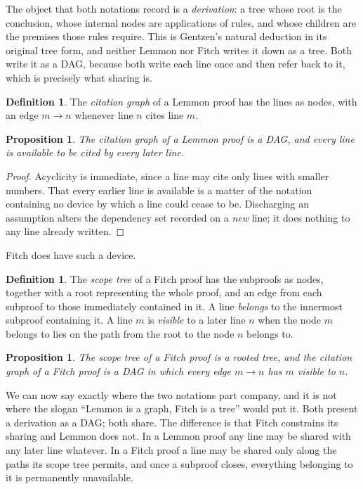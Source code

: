 \documentclass[11pt]{article}
\theoremstyle{plain}
\newtheorem{proposition}[theorem]{Proposition}
\theoremstyle{definition}
\newtheorem{definition}[theorem]{Definition}
\theoremstyle{remark}
\begin{document}
The object that both notations record is a \emph{derivation}: a tree whose
root is the conclusion, whose internal nodes are applications of rules, and
whose children are the premises those rules require. This is Gentzen's
natural deduction in its original tree form, and neither Lemmon nor Fitch
writes it down as a tree. Both write it as a DAG, because both write each line
once and then refer back to it, which is precisely what sharing is.

\begin{definition}
The \emph{citation graph} of a Lemmon proof has the lines as nodes, with an
edge $m \to n$ whenever line $n$ cites line $m$.
\end{definition}

\begin{proposition}\label{prop:lemmondag}
The citation graph of a Lemmon proof is a DAG, and every line is available to
be cited by every later line.
\end{proposition}

\begin{proof}
Acyclicity is immediate, since a line may cite only lines with smaller
numbers. That every earlier line is available is a matter of the notation
containing no device by which a line could cease to be. Discharging an
assumption alters the dependency set recorded on a \emph{new} line; it does
nothing to any line already written.
\end{proof}

Fitch does have such a device.

\begin{definition}
The \emph{scope tree} of a Fitch proof has the subproofs as nodes, together
with a root representing the whole proof, and an edge from each subproof to
those immediately contained in it. A line \emph{belongs} to the innermost
subproof containing it. A line $m$ is \emph{visible} to a later line $n$ when
the node $m$ belongs to lies on the path from the root to the node $n$ belongs
to.
\end{definition}

\begin{proposition}\label{prop:fitchtree}
The scope tree of a Fitch proof is a rooted tree, and the citation graph of a
Fitch proof is a DAG in which every edge $m \to n$ has $m$ visible to $n$.
\end{proposition}

We can now say exactly where the two notations part company, and it is not
where the slogan ``Lemmon is a graph, Fitch is a tree'' would put it. Both
present a derivation as a DAG; both share. The difference is that Fitch
constrains its sharing and Lemmon does not. In a Lemmon proof any line may be
shared with any later line whatever. In a Fitch proof a line may be shared
only along the paths its scope tree permits, and once a subproof closes,
everything belonging to it is permanently unavailable.
\end{document}
